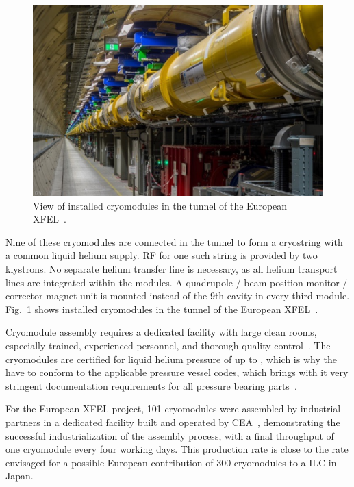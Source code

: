 \begin{figure}[htbp]
   \includegraphics[width=\hsize]{chapters/figures/srf17-moxa02-fig1}
\caption{View of installed cryomodules in the tunnel of the European XFEL~\cite{Reschke:2018ywk}.
}
\label{fig:xfel-tunnel}
\end{figure}


Nine of these cryomodules are connected in the tunnel to form a cryostring with a common liquid helium supply.  RF for one such string is provided by two klystrons.
No separate helium transfer line is necessary, as all helium transport lines are integrated within the modules.  A  quadrupole / beam position monitor / corrector magnet unit  is mounted instead of the 9th cavity in every third module.
Fig.~\ref{fig:xfel-tunnel} shows installed cryomodules in the tunnel of the European XFEL~\cite{Reschke:2018ywk}.

Cryomodule assembly requires a dedicated facility with large clean rooms, especially trained, experienced personnel, and thorough quality control~\cite{Berry:2017gpt}.
The cryomodules are certified for liquid helium pressure of up to , which is why the have to conform to the applicable pressure vessel codes, which brings with it very stringent documentation requirements for all pressure bearing parts~\cite{Peterson:2011zz}.

For the European XFEL project, 101 cryomodules were assembled by industrial partners in a dedicated facility built and operated by CEA~\cite{Weise:2014zqa,Berry:2017gpt}, demonstrating the successful industrialization of the assembly process, with a final throughput of one cryomodule every four working days.
This production rate is close to the rate envisaged for a possible European contribution of 300 cryomodules to a  ILC in Japan.

